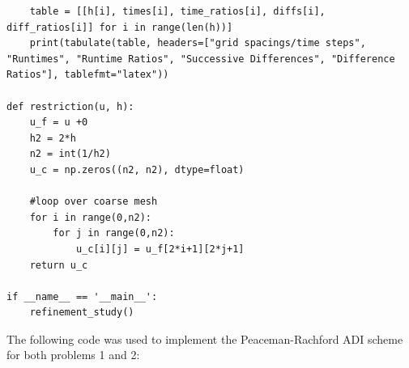 \documentclass[12pt]{article}
\begin{document}
\begin{verbatim}
    table = [[h[i], times[i], time_ratios[i], diffs[i], diff_ratios[i]] for i in range(len(h))]
    print(tabulate(table, headers=["grid spacings/time steps", "Runtimes", "Runtime Ratios", "Successive Differences", "Difference Ratios"], tablefmt="latex"))

def restriction(u, h):
    u_f = u +0
    h2 = 2*h
    n2 = int(1/h2)
    u_c = np.zeros((n2, n2), dtype=float)

    #loop over coarse mesh
    for i in range(0,n2):
        for j in range(0,n2):
            u_c[i][j] = u_f[2*i+1][2*j+1]
    return u_c

if __name__ == '__main__':
    refinement_study()  
\end{verbatim}

The following code was used to implement the Peaceman-Rachford ADI scheme for both problems 1 and 2:
\end{document}
